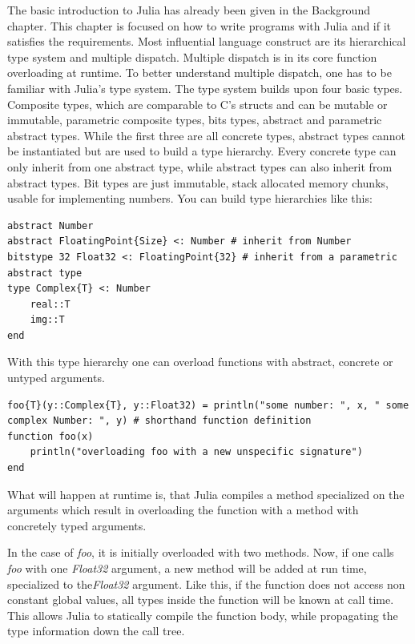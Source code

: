 The basic introduction to Julia has already been given in the Background chapter.
This chapter is focused on how to write programs with Julia and if it satisfies the requirements.
Most influential language construct are its hierarchical type system and multiple dispatch.
Multiple dispatch is in its core function overloading at runtime. 
To better understand multiple dispatch, one has to be familiar with Julia's type system.
The type system builds upon four basic types\cite{DBLP:journals/corr/BezansonEKS14}.
Composite types, which are comparable to C's structs and can be mutable or immutable, parametric composite types, bits types, abstract and parametric abstract types.
While the first three are all concrete types, abstract types cannot be instantiated but are used to build a type hierarchy.
Every concrete type can only inherit from one abstract type, while abstract types can also inherit from abstract types.
Bit types are just immutable, stack allocated memory chunks, usable for implementing numbers.
You can build type hierarchies like this:
\begin{lstlisting}
abstract Number
abstract FloatingPoint{Size} <: Number # inherit from Number
bitstype 32 Float32 <: FloatingPoint{32} # inherit from a parametric abstract type
type Complex{T} <: Number
    real::T
    img::T
end
\end{lstlisting}

With this type hierarchy one can overload functions with abstract, concrete or untyped arguments.

\begin{lstlisting}
foo{T}(y::Complex{T}, y::Float32) = println("some number: ", x, " some complex Number: ", y) # shorthand function definition
function foo(x)
    println("overloading foo with a new unspecific signature")
end
\end{lstlisting}

What will happen at runtime is, that Julia compiles a method specialized on the arguments which result in overloading the function with a method with concretely typed arguments.

In the case of \textit{foo}, it is initially overloaded with two methods.
Now, if one calls \textit{foo} with one \textit{Float32} argument, a new method will be added at run time, specialized to the\textit{Float32} argument.
Like this, if the function does not access non constant global values, all types inside the function will be known at call time.
This allows Julia to statically compile the function body, while propagating the type information down the call tree.

